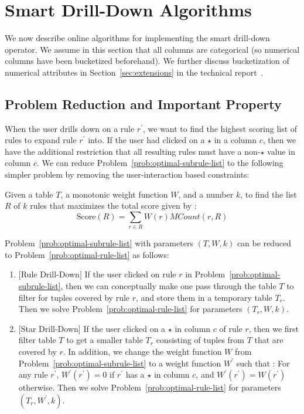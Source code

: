 

\section{Smart Drill-Down Algorithms} \label{sec:algorithms}
We now describe online algorithms for implementing
the smart drill-down operator. We assume in this section that all columns are categorical (so numerical columns have been bucketized beforehand). We further discuss bucketization of numerical attributes in Section~\ref{sec:extensions} in the technical report~\cite{tr}.


\subsection{Problem Reduction and Important Property} \label{sec:reduction}
When the user drills down on a rule $r^{\prime}$, we want to find the highest scoring list of rules to expand rule $r^{\prime}$ into. If the user had clicked on a $\star$ in a column $c$, then we have the additional restriction that all resulting rules must have a non-$\star$ value in column $c$. We can reduce Problem~\ref{prob:optimal-subrule-list} to the following simpler problem by removing the user-interaction based constraints: 

\begin{problem}\label{prob:optimal-rule-list}
Given a table $T$, a monotonic weight function $W$, and a number $k$, to find the list $R$ of $k$ rules that maximizes the total score given by :
$$\text{Score}(R) = \sum_{r \in R}W(r)MCount(r,R)$$
\end{problem}

\noindent Problem~\ref{prob:optimal-subrule-list} with parameters $(T, W, k)$ can be reduced to Problem~\ref{prob:optimal-rule-list} as follows:
\begin{enumerate}
\item $[$Rule Drill-Down$]$ If the user clicked on rule $r$ in Problem~\ref{prob:optimal-subrule-list}, then we can conceptually make one pass through the table $T$ to filter for tuples covered by rule $r$, and store them in a temporary table $T_r$. Then we solve Problem~\ref{prob:optimal-rule-list} for parameters $(T_r, W, k)$.
\item $[$Star Drill-Down$]$ If the user clicked on a $\star$ in column $c$ of rule $r$, then we first filter table $T$ to get a smaller table $T_r$ consisting of tuples from $T$ that are covered by $r$. In addition, we change the weight function $W$ from Problem~\ref{prob:optimal-subrule-list} to a weight function $W^{\prime}$ such that : For any rule $r^{\prime}$, $W^{\prime}(r^{\prime}) = 0$ if $r^{\prime}$ has a $\star$ in column $c$, and $W^{\prime}(r^{\prime}) = W(r^{\prime})$ otherwise. Then we solve Problem~\ref{prob:optimal-rule-list} for parameters $(T_r, W^{\prime}, k)$.
\end{enumerate}


